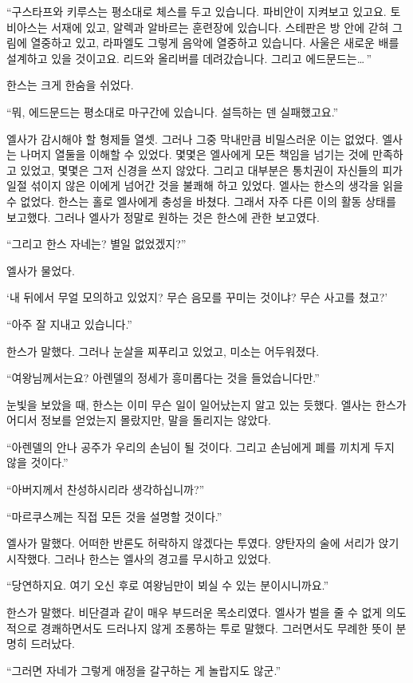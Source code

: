 ``구스타프와 키루스는 평소대로 체스를 두고 있습니다. 파비안이 지켜보고 있고요. 토비아스는 서재에 있고, 알렉과 알바르는 훈련장에 있습니다. 스테판은 방 안에 갇혀 그림에 열중하고 있고, 라파엘도 그렇게 음악에 열중하고 있습니다. 사울은 새로운 배를 설계하고 있을 것이고요. 리드와 올리버를 데려갔습니다. 그리고 에드문드는\ldots\,''

한스는 크게 한숨을 쉬었다.

``뭐, 에드문드는 평소대로 마구간에 있습니다. 설득하는 덴 실패했고요.''

엘사가 감시해야 할 형제들 열셋. 그러나 그중 막내만큼 비밀스러운 이는 없었다. 엘사는 나머지 열둘을 이해할 수 있었다. 몇몇은 엘사에게 모든 책임을 넘기는 것에 만족하고 있었고, 몇몇은 그저 신경을 쓰지 않았다. 그리고 대부분은 통치권이 자신들의 피가 일절 섞이지 않은 이에게 넘어간 것을 불쾌해 하고 있었다. 엘사는 한스의 생각을 읽을 수 없었다. 한스는 홀로 엘사에게 충성을 바쳤다. 그래서 자주 다른 이의 활동 상태를 보고했다. 그러나 엘사가 정말로 원하는 것은 한스에 관한 보고였다.

``그리고 한스 자네는? 별일 없었겠지?''

엘사가 물었다.

`내 뒤에서 무얼 모의하고 있었지? 무슨 음모를 꾸미는 것이냐? 무슨 사고를 쳤고?'

``아주 잘 지내고 있습니다.''

한스가 말했다. 그러나 눈살을 찌푸리고 있었고, 미소는 어두워졌다.

``여왕님께서는요? 아렌델의 정세가 흥미롭다는 것을 들었습니다만.''

눈빛을 보았을 때, 한스는 이미 무슨 일이 일어났는지 알고 있는 듯했다. 엘사는 한스가 어디서 정보를 얻었는지 몰랐지만, 말을 돌리지는 않았다.

``아렌델의 안나 공주가 우리의 손님이 될 것이다. 그리고 손님에게 폐를 끼치게 두지 않을 것이다.''

``아버지께서 찬성하시리라 생각하십니까?''

``마르쿠스께는 직접 모든 것을 설명할 것이다.''

엘사가 말했다. 어떠한 반론도 허락하지 않겠다는 투였다. 양탄자의 술에 서리가 앉기 시작했다. 그러나 한스는 엘사의 경고를 무시하고 있었다.

``당연하지요. 여기 오신 후로 여왕님만이 뵈실 수 있는 분이시니까요.''

한스가 말했다. 비단결과 같이 매우 부드러운 목소리였다. 엘사가 벌을 줄 수 없게 의도적으로 경쾌하면서도 드러나지 않게 조롱하는 투로 말했다. 그러면서도 무례한 뜻이 분명히 드러났다.

``그러면 자네가 그렇게 애정을 갈구하는 게 놀랍지도 않군.''

